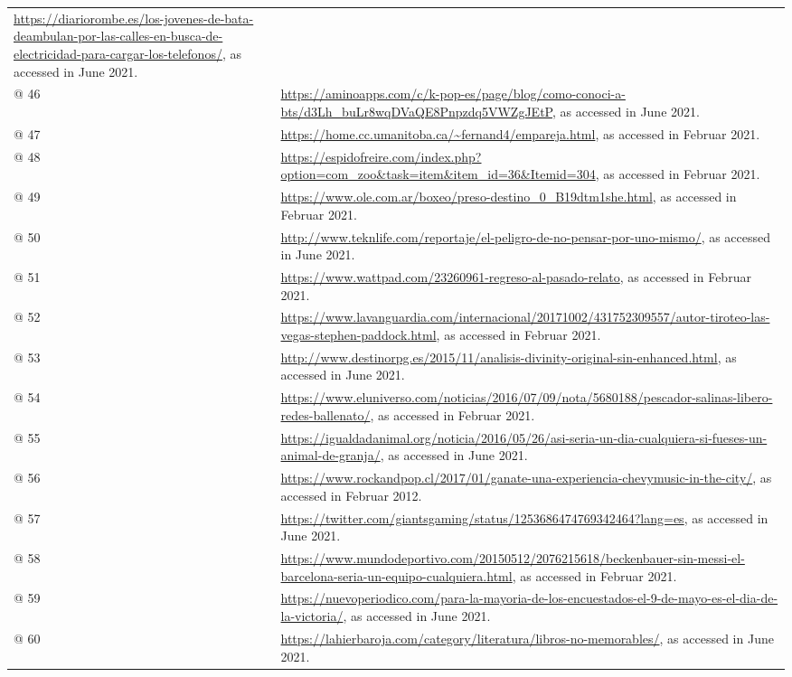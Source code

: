 \begin{flushleft}
\begin{supertabular}{m{0.7955598in}m{5.35876in}}
\url{https://diariorombe.es/los-jovenes-de-bata-deambulan-por-las-calles-en-busca-de-electricidad-para-cargar-los-telefonos/}, as accessed in June 2021.\\
@ 46  &
\url{https://aminoapps.com/c/k-pop-es/page/blog/como-conoci-a-bts/d3Lh_buLr8wqDVaQE8Pnpzdq5VWZgJEtP}, as accessed in June 2021.\\
@ 47  &
\url{https://home.cc.umanitoba.ca/~fernand4/empareja.html}, as accessed in Februar 2021.\\
@ 48  &
\url{https://espidofreire.com/index.php?option=com_zoo&task=item&item_id=36&Itemid=304}, as accessed in Februar 2021.\\
@ 49  &
\url{https://www.ole.com.ar/boxeo/preso-destino_0_B19dtm1she.html}, as accessed in Februar 2021.\\
@ 50  &
\url{http://www.teknlife.com/reportaje/el-peligro-de-no-pensar-por-uno-mismo/}, as accessed in June 2021.\\
@ 51  &
\url{https://www.wattpad.com/23260961-regreso-al-pasado-relato}, as accessed in Februar 2021.\\
@ 52  &
\url{https://www.lavanguardia.com/internacional/20171002/431752309557/autor-tiroteo-las-vegas-stephen-paddock.html}, as accessed in Februar 2021.\\
@ 53  &
\url{http://www.destinorpg.es/2015/11/analisis-divinity-original-sin-enhanced.html}, as accessed in June 2021.\\
@ 54  &
\url{https://www.eluniverso.com/noticias/2016/07/09/nota/5680188/pescador-salinas-libero-redes-ballenato/}, as accessed in Februar 2021.\\
@ 55  &
\url{https://igualdadanimal.org/noticia/2016/05/26/asi-seria-un-dia-cualquiera-si-fueses-un-animal-de-granja/}, as accessed in June 2021.\\
@ 56  &
\url{https://www.rockandpop.cl/2017/01/ganate-una-experiencia-chevymusic-in-the-city/}, as accessed in Februar 2012.\\
@ 57  &
\url{https://twitter.com/giantsgaming/status/1253686474769342464?lang=es}, as accessed in June 2021.\\
@ 58  &
\url{https://www.mundodeportivo.com/20150512/2076215618/beckenbauer-sin-messi-el-barcelona-seria-un-equipo-cualquiera.html}, as accessed in Februar 2021.\\
@ 59  &
\url{https://nuevoperiodico.com/para-la-mayoria-de-los-encuestados-el-9-de-mayo-es-el-dia-de-la-victoria/}, as accessed in June 2021.\\
@ 60  &
\url{https://lahierbaroja.com/category/literatura/libros-no-memorables/}, as accessed in June 2021.\\

\end{supertabular}
\end{flushleft}
